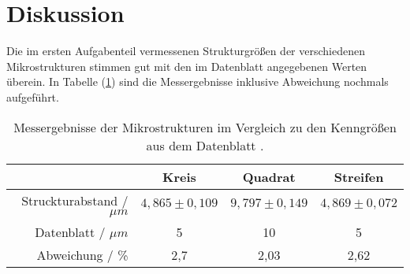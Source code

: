 \section{Diskussion}
\label{sec:Diskussion}
Die im ersten Aufgabenteil vermessenen Strukturgr\"o{\ss}en der verschiedenen Mikrostrukturen stimmen gut mit den im Datenblatt angegebenen Werten \"uberein.
In Tabelle (\ref{tab:auf1_disk}) sind die Messergebnisse inklusive Abweichung nochmals aufgef\"uhrt.

\begin{table}
	\centering
	\caption{Messergebnisse der Mikrostrukturen im Vergleich zu den Kenngr\"o{\ss}en aus dem Datenblatt \cite{sample}.}
\begin{tabular}{|r|ccc|}
	\hline
	{} & {Kreis} & {Quadrat} & {Streifen} \\
	\hline
	Struckturabstand / $\mu m$ & $4,865 \pm 0,109$ & $ 9,797 \pm 0,149$ & $4,869 \pm 0,072$ \\
	Datenblatt / $\mu m$ & 5 & 10 & 5 \\
	Abweichung / \%	& 2,7 & 2,03 & 2,62 \\
	\hline
\end{tabular}
\label{tab:auf1_disk}
\end{table}

